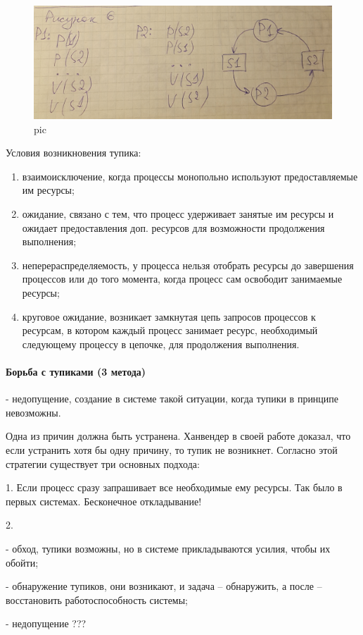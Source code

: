 \begin{figure}[H]
    \centering
    \includegraphics[width=\textwidth]{pic/6.png}
    \caption{pic}
\end{figure}

Условия возникновения тупика:
\begin{enumerate}
    \item взаимоисключение, когда процессы монопольно используют предоставляемые им ресурсы;
    \item ожидание, связано с тем, что процесс удерживает занятые им ресурсы и ожидает предоставления доп. ресурсов для возможности продолжения выполнения;
    \item неперераспределяемость, у процесса нельзя отобрать ресурсы до завершения процессов или до того момента, когда процесс сам освободит занимаемые ресурсы;
    \item круговое ожидание, возникает замкнутая цепь запросов процессов к ресурсам, в котором каждый процесс занимает ресурс, необходимый следующему процессу в цепочке, для продолжения выполнения.
\end{enumerate} 


\paragraph{Борьба с тупиками (3 метода)}

- недопущение, создание в системе такой ситуации, когда тупики в принципе невозможны. 

Одна из причин должна быть устранена. Ханвендер в своей работе доказал, что если устранить хотя бы одну причину, то тупик не возникнет. Согласно этой стратегии существует  три основных подхода:

1. Если процесс сразу запрашивает все необходимые ему ресурсы. Так было в первых системах. Бесконечное откладывание! 

2. 

- обход, тупики возможны, но в системе прикладываются усилия, чтобы их обойти;

- обнаружение тупиков, они возникают, и задача – обнаружить, а после – восстановить работоспособность системы;

- недопущение ???
